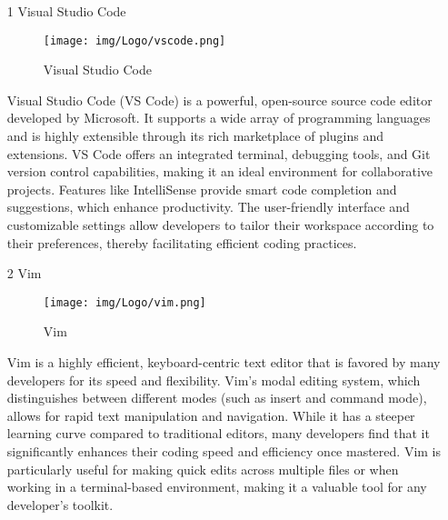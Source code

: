 \documentclass[conference]{IEEEtran}
\begin{document}
\begin{enumerate}
    \item[1] Visual Studio Code\par
    \vspace{0.3em}
    \begin{figure}[h]
    \centering
    \texttt{[image: img/Logo/vscode.png]}
    \centering
    \caption{Visual Studio Code} 
    \end{figure}\par
    \vspace{0.3em}
    
    Visual Studio Code (VS Code) is a powerful, open-source source code editor developed by Microsoft. It supports a wide array of programming languages and is highly extensible through its rich marketplace of plugins and extensions. VS Code offers an integrated terminal, debugging tools, and Git version control capabilities, making it an ideal environment for collaborative projects. Features like IntelliSense provide smart code completion and suggestions, which enhance productivity. The user-friendly interface and customizable settings allow developers to tailor their workspace according to their preferences, thereby facilitating efficient coding practices.

    \vspace{1em}

    \item[2] Vim\par
    \vspace{0.3em}
    \begin{figure}[h]
    \centering
    \texttt{[image: img/Logo/vim.png]}
    \centering
    \caption{Vim} 
    \end{figure}\par
    \vspace{0.3em}
    Vim is a highly efficient, keyboard-centric text editor that is favored by many developers for its speed and flexibility. Vim’s modal editing system, which distinguishes between different modes (such as insert and command mode), allows for rapid text manipulation and navigation. While it has a steeper learning curve compared to traditional editors, many developers find that it significantly enhances their coding speed and efficiency once mastered. Vim is particularly useful for making quick edits across multiple files or when working in a terminal-based environment, making it a valuable tool for any developer’s toolkit.


\end{enumerate}
\end{document}
